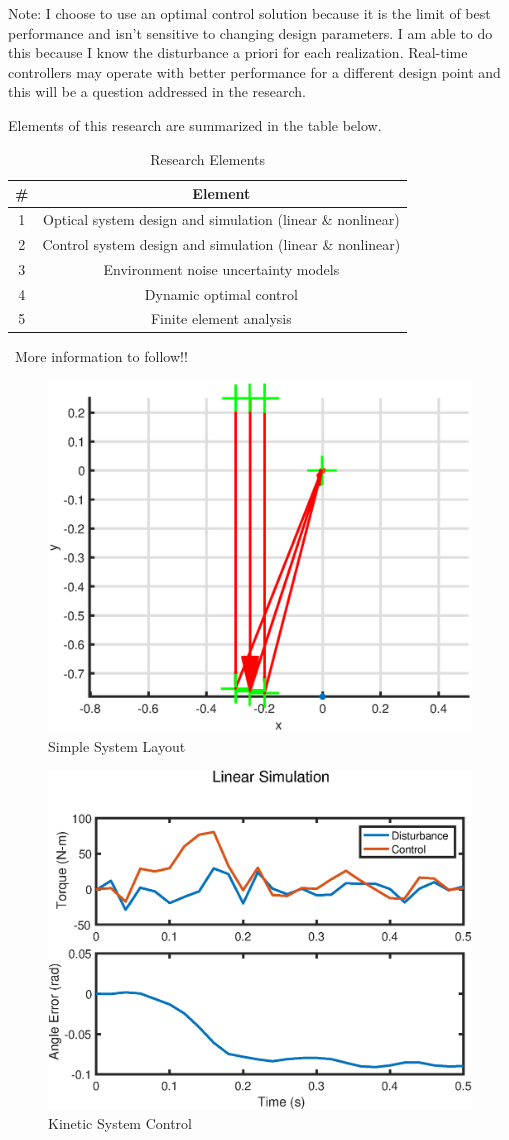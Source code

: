 \documentclass{aiaa-tc}
\begin{document}
Note: I choose to use an optimal control solution because it is the limit of best performance and isn't sensitive to changing design parameters. I am able to do this because I know the disturbance a priori for each realization. Real-time controllers may operate with better performance for a different design point and this will be a question addressed in the research.

Elements of this research are summarized in the table below.

\begin{table}
  \centering
  \caption{Research Elements}
  \label{t:researchElements}
  \begin{tabular}{cc}
       \# & Element \\\hline
        1 &  Optical system design and simulation (linear \& nonlinear) \\
        2 &  Control system design and simulation (linear \& nonlinear) \\
        3 &  Environment noise uncertainty models \\
        4 &  Dynamic optimal control \\
        5 &  Finite element analysis 
  \end{tabular}
\end{table}
\
More information to follow!!

\newpage


\begin{figure}[t]	%
 \centering
 \includegraphics[height=0.5\textwidth,trim={2cm 0 0 1cm}]{Figures/SimpleLayout}
 \caption{Simple System Layout}
 \label{simplefig}
\end{figure}

\begin{figure}[b]	%
 \centering
 \includegraphics[height=0.5\textwidth,trim={2cm 0 0 1cm}]{Figures/dynamicsPlot}
 \caption{Kinetic System Control}
 \label{KinSys}
\end{figure}
\end{document}

